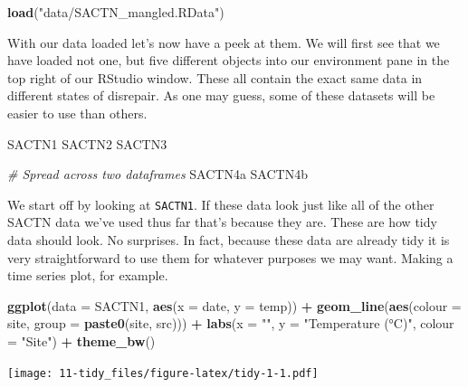 \documentclass[
]{book}
\newenvironment{Shaded}{\begin{snugshade}}{\end{snugshade}}
\newcommand{\CommentTok}[1]{\textcolor[rgb]{0.56,0.35,0.01}{\textit{#1}}}
\newcommand{\DataTypeTok}[1]{\textcolor[rgb]{0.13,0.29,0.53}{#1}}
\newcommand{\KeywordTok}[1]{\textcolor[rgb]{0.13,0.29,0.53}{\textbf{#1}}}
\newcommand{\NormalTok}[1]{#1}
\newcommand{\OperatorTok}[1]{\textcolor[rgb]{0.81,0.36,0.00}{\textbf{#1}}}
\newcommand{\StringTok}[1]{\textcolor[rgb]{0.31,0.60,0.02}{#1}}
\begin{document}
\begin{Shaded}
\begin{Highlighting}[]
\KeywordTok{load}\NormalTok{(}\StringTok{"data/SACTN\_mangled.RData"}\NormalTok{)}
\end{Highlighting}
\end{Shaded}

With our data loaded let's now have a peek at them. We will first see that we have loaded not one, but five different objects into our environment pane in the top right of our RStudio window. These all contain the exact same data in different states of disrepair. As one may guess, some of these datasets will be easier to use than others.

\begin{Shaded}
\begin{Highlighting}[]
\NormalTok{SACTN1}
\NormalTok{SACTN2}
\NormalTok{SACTN3}

\CommentTok{\# Spread across two dataframes}
\NormalTok{SACTN4a}
\NormalTok{SACTN4b}
\end{Highlighting}
\end{Shaded}

We start off by looking at \texttt{SACTN1}. If these data look just like all of the other SACTN data we've used thus far that's because they are. These are how tidy data should look. No surprises. In fact, because these data are already tidy it is very straightforward to use them for whatever purposes we may want. Making a time series plot, for example.

\begin{Shaded}
\begin{Highlighting}[]
\KeywordTok{ggplot}\NormalTok{(}\DataTypeTok{data =}\NormalTok{ SACTN1, }\KeywordTok{aes}\NormalTok{(}\DataTypeTok{x =}\NormalTok{ date, }\DataTypeTok{y =}\NormalTok{ temp)) }\OperatorTok{+}
\StringTok{  }\KeywordTok{geom\_line}\NormalTok{(}\KeywordTok{aes}\NormalTok{(}\DataTypeTok{colour =}\NormalTok{ site, }\DataTypeTok{group =} \KeywordTok{paste0}\NormalTok{(site, src))) }\OperatorTok{+}
\StringTok{  }\KeywordTok{labs}\NormalTok{(}\DataTypeTok{x =} \StringTok{""}\NormalTok{, }\DataTypeTok{y =} \StringTok{"Temperature (°C)"}\NormalTok{, }\DataTypeTok{colour =} \StringTok{"Site"}\NormalTok{) }\OperatorTok{+}
\StringTok{  }\KeywordTok{theme\_bw}\NormalTok{()}
\end{Highlighting}
\end{Shaded}

\texttt{[image: 11-tidy\_files/figure-latex/tidy-1-1.pdf]}
\end{document}
